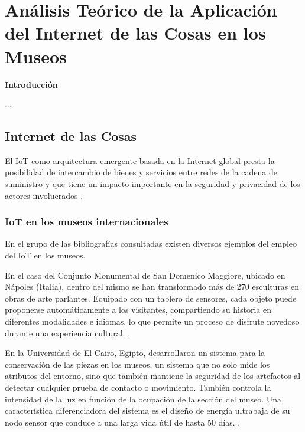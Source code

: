 \chapter{Análisis Teórico de la Aplicación del Internet de las Cosas en los Museos} \label{cap:analisis_teorico}

        \textbf{\Large Introducción}\newline

        ...

    \section{Internet de las Cosas}

    El IoT como arquitectura emergente basada en la Internet global presta la posibilidad de intercambio de bienes y servicios entre redes de la cadena de suministro y que tiene un impacto importante en la seguridad y privacidad de los actores involucrados \cite{weber}. 
   
    \subsection{IoT en los museos internacionales}\label{sec:iotMundo}
        
        En el grupo de las bibliografías consultadas existen diversos ejemplos del empleo del IoT en los museos.

        En el caso del Conjunto Monumental de San Domenico Maggiore, ubicado en Nápoles (Italia), dentro del mismo se han transformado más de 270 esculturas en obras de arte parlantes. Equipado con un tablero de sensores, cada objeto puede proponerse automáticamente a los visitantes, compartiendo su historia en diferentes modalidades e idiomas, lo que permite un proceso de disfrute novedoso durante una experiencia cultural. \cite{monumentoSanDomenico}.
    
        En la Universidad de El Cairo, Egipto, desarrollaron un sistema para la conservación de las piezas en los museos, un sistema que no solo mide los atributos del entorno, sino que también mantiene la seguridad de los artefactos al detectar cualquier prueba de contacto o movimiento. También controla la intensidad de la luz en función de la ocupación de la sección del museo. Una característica diferenciadora del sistema es el diseño de energía ultrabaja de su nodo sensor que conduce a una larga vida útil de hasta 50 días. \cite{ultraLowPowerConservacion}.
    
